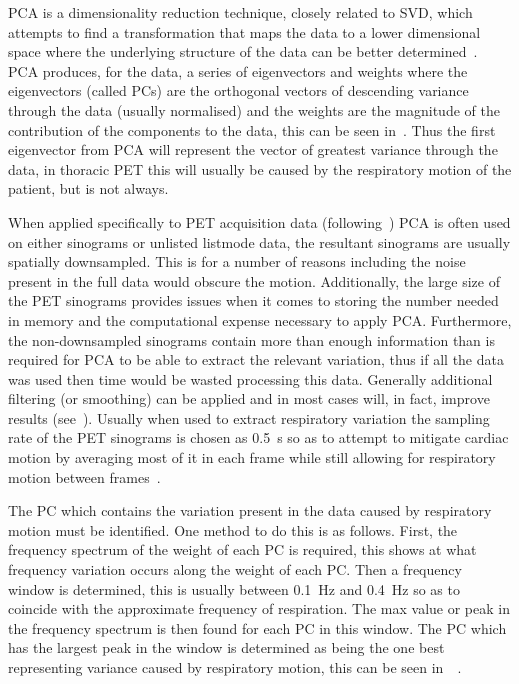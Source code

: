                 \gls{PCA} is a dimensionality reduction technique, closely related to \gls{SVD}, which attempts to find a transformation that maps the data to a lower dimensional space where the underlying structure of the data can be better determined~\parencite{Pearson1901OnSpace}. \gls{PCA} produces, for the data, a series of eigenvectors and weights where the eigenvectors (called \glspl{PC}) are the orthogonal vectors of descending variance through the data (usually normalised) and the weights are the magnitude of the contribution of the components to the data, this can be seen in~. Thus the first eigenvector from \gls{PCA} will represent the vector of greatest variance through the data, in thoracic \gls{PET} this will usually be caused by the respiratory motion of the patient, but is not always.
                
                When applied specifically to \gls{PET} acquisition data (following~\parencite{Thielemans2011}) \gls{PCA} is often used on either sinograms or unlisted listmode data, the resultant sinograms are usually spatially downsampled. This is for a number of reasons including the noise present in the full data would obscure the motion. Additionally, the large size of the \gls{PET} sinograms provides issues when it comes to storing the number needed in memory and the computational expense necessary to apply \gls{PCA}. Furthermore, the non-downsampled sinograms contain more than enough information than is required for \gls{PCA} to be able to extract the relevant variation, thus if all the data was used then time would be wasted processing this data. Generally additional filtering (or smoothing) can be applied and in most cases will, in fact, improve results (see~). Usually when used to extract respiratory variation the sampling rate of the \gls{PET} sinograms is chosen as \SI{0.5}{\second} so as to attempt to mitigate cardiac motion by averaging most of it in each frame while still allowing for respiratory motion between frames~\parencite{Bertolli2018Data-DrivenTomography}.
                
                The \gls{PC} which contains the variation present in the data caused by respiratory motion must be identified. One method to do this is as follows. First, the frequency spectrum of the weight of each \gls{PC} is required, this shows at what frequency variation occurs along the weight of each \gls{PC}. Then a frequency window is determined, this is usually between \SI{0.1}{\hertz} and \SI{0.4}{\hertz} so as to coincide with the approximate frequency of respiration. The max value or peak in the frequency spectrum is then found for each \gls{PC} in this window. The \gls{PC} which has the largest peak in the window is determined as being the one best representing variance caused by respiratory motion, this can be seen in~~\parencite{Thielemans2011}.
                

